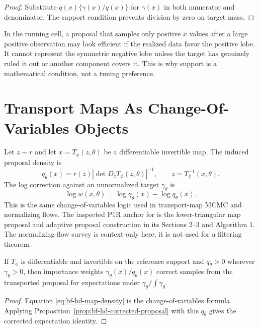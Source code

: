 \begin{proof}
Substitute \(q(x)\{\gamma(x)/q(x)\}\) for \(\gamma(x)\) in both numerator and
denominator.  The support condition prevents division by zero on target mass.
\end{proof}

In the running cell, a proposal that samples only positive \(x\) values after a
large positive observation may look efficient if the realized data favor the
positive lobe.  It cannot represent the symmetric negative lobe unless the
target has genuinely ruled it out or another component covers it.  This is why
support is a mathematical condition, not a tuning preference.

\section{Transport Maps As Change-Of-Variables Objects}
\label{sec:bf-hd-transport-change}

Let \(z\sim r\) and let \(x=T_\phi(z,\theta)\) be a differentiable invertible
map.  The induced proposal density is
\begin{equation}
  q_\theta(x)
  =
  r(z)\left|\det D_zT_\phi(z,\theta)\right|^{-1},
  \qquad z=T_\phi^{-1}(x,\theta).
  \label{eq:bf-hd-map-density}
\end{equation}
The log correction against an unnormalized target \(\gamma_\theta\) is
\begin{equation}
  \log w(x,\theta)=\log\gamma_\theta(x)-\log q_\theta(x).
  \label{eq:bf-hd-transport-log-weight}
\end{equation}
This is the same change-of-variables logic used in transport-map MCMC and
normalizing flows.  The inspected P1R anchor for \citet{parno2018transport} is
the lower-triangular map proposal and adaptive proposal construction in its
Sections 2--3 and Algorithm 1.  The normalizing-flow survey
\citet{papamakarios2021flows} is context-only here; it is not used for a
filtering theorem.

\begin{proposition}
\label{prop:bf-hd-transport-correction}
If \(T_\phi\) is differentiable and invertible on the reference support and
\(q_\theta>0\) wherever \(\gamma_\theta>0\), then importance weights
\(\gamma_\theta(x)/q_\theta(x)\) correct samples from the transported proposal
for expectations under \(\gamma_\theta/\int\gamma_\theta\).
\end{proposition}

\begin{proof}
Equation \eqref{eq:bf-hd-map-density} is the change-of-variables formula.
Applying Proposition~\ref{prop:bf-hd-corrected-proposal} with this \(q_\theta\)
gives the corrected expectation identity.
\end{proof}

